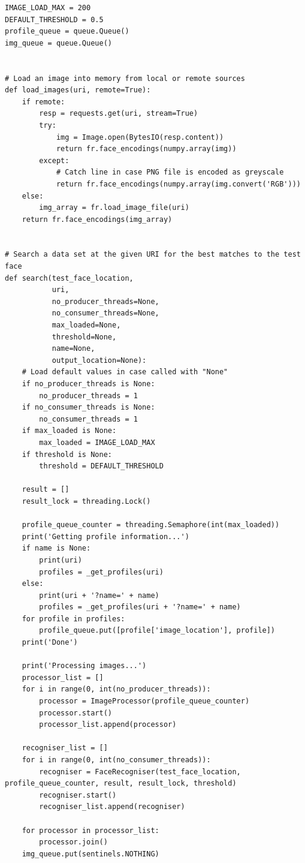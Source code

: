 \documentclass[12pt]{article}
\begin{document}
\begin{appendices}
\begin{lstlisting}
IMAGE_LOAD_MAX = 200
DEFAULT_THRESHOLD = 0.5
profile_queue = queue.Queue()
img_queue = queue.Queue()


# Load an image into memory from local or remote sources
def load_images(uri, remote=True):
    if remote:
        resp = requests.get(uri, stream=True)
        try:
            img = Image.open(BytesIO(resp.content))
            return fr.face_encodings(numpy.array(img))
        except:
            # Catch line in case PNG file is encoded as greyscale
            return fr.face_encodings(numpy.array(img.convert('RGB')))
    else:
        img_array = fr.load_image_file(uri)
    return fr.face_encodings(img_array)


# Search a data set at the given URI for the best matches to the test face
def search(test_face_location,
           uri,
           no_producer_threads=None,
           no_consumer_threads=None,
           max_loaded=None,
           threshold=None,
           name=None,
           output_location=None):
    # Load default values in case called with "None"
    if no_producer_threads is None:
        no_producer_threads = 1
    if no_consumer_threads is None:
        no_consumer_threads = 1
    if max_loaded is None:
        max_loaded = IMAGE_LOAD_MAX
    if threshold is None:
        threshold = DEFAULT_THRESHOLD

    result = []
    result_lock = threading.Lock()

    profile_queue_counter = threading.Semaphore(int(max_loaded))
    print('Getting profile information...')
    if name is None:
        print(uri)
        profiles = _get_profiles(uri)
    else:
        print(uri + '?name=' + name)
        profiles = _get_profiles(uri + '?name=' + name)
    for profile in profiles:
        profile_queue.put([profile['image_location'], profile])
    print('Done')

    print('Processing images...')
    processor_list = []
    for i in range(0, int(no_producer_threads)):
        processor = ImageProcessor(profile_queue_counter)
        processor.start()
        processor_list.append(processor)

    recogniser_list = []
    for i in range(0, int(no_consumer_threads)):
        recogniser = FaceRecogniser(test_face_location, profile_queue_counter, result, result_lock, threshold)
        recogniser.start()
        recogniser_list.append(recogniser)

    for processor in processor_list:
        processor.join()
    img_queue.put(sentinels.NOTHING)


\end{lstlisting}
\end{appendices}
\end{document}
